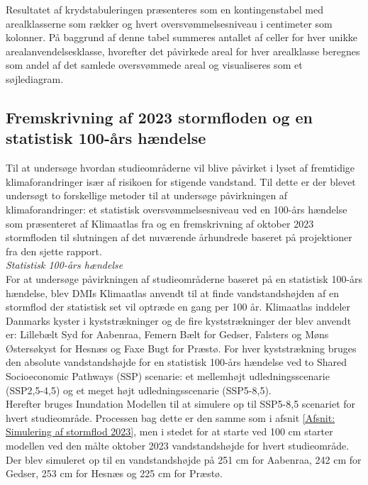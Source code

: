 Resultatet af krydstabuleringen præsenteres som en kontingenstabel med arealklasserne som rækker og hvert oversvømmelsesniveau i centimeter som kolonner. På baggrund af denne tabel summeres antallet af celler for hver unikke arealanvendelsesklasse, hvorefter det påvirkede areal for hver arealklasse beregnes som andel af det samlede oversvømmede areal og visualiseres som et søjlediagram. 

\subsection{Fremskrivning af 2023 stormfloden og en statistisk 100-års hændelse} \label{Afsnit: Fremskrivning og statistisk}

Til at undersøge hvordan studieområderne vil blive påvirket i lyset af fremtidige klimaforandringer især af risikoen for stigende vandstand. Til dette er der blevet undersøgt to forskellige metoder til at undersøge påvirkningen af klimaforandringer: et statistisk oversvømmelsesniveau ved en 100-års hændelse som præsenteret af Klimaatlas fra \cite{dmi_data_2025} og en fremskrivning af oktober 2023 stormfloden til slutningen af det nuværende århundrede baseret på projektioner fra den sjette \cite{ipcc_report_AR6} rapport.\\

{\large \textit{Statistisk 100-års hændelse}}\\
For at undersøge påvirkningen af studieområderne baseret på en statistisk 100-års hændelse, blev DMIs Klimaatlas anvendt til at finde vandstandshøjden af en stormflod der statistisk set vil optræde en gang per 100 år. Klimaatlas inddeler Danmarks kyster i kyststrækninger og de fire kyststrækninger der blev anvendt er: Lillebælt Syd for Aabenraa, Femern Bælt for Gedser, Falsters og Møns Østersøkyst for Hesnæs og Faxe Bugt for Præstø. For hver kyststrækning bruges den absolute vandstandshøjde for en statistisk 100-års hændelse ved to Shared Socioeconomic Pathways (SSP) scenarie: et mellemhøjt udledningsscenarie (SSP2,5-4,5) og et meget højt udledningsscenarie (SSP5-8,5). \\
Herefter bruges Inundation Modellen til at simulere op til SSP5-8,5 scenariet for hvert studieområde. Processen bag dette er den samme som i afsnit \ref{Afsnit: Simulering af stormflod 2023}, men i stedet for at starte ved 100 cm starter modellen ved den målte oktober 2023 vandstandshøjde for hvert studieområde. Der blev simuleret op til en vandstandshøjde på 251 cm for Aabenraa, 242 cm for Gedser, 253 cm for Hesnæs og 225 cm for Præstø. \\

